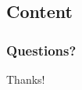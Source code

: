 \documentclass{i20lecture}
\begin{document}
\subsection{Content}

\begin{frame}
  \frametitle{\insertsection}
  \framesubtitle{\insertsubsection}

\end{frame}

\begin{frame}
  \frametitle{Questions?}

  \begin{center}
    \LARGE Thanks!
  \end{center}

\end{frame}
\end{document}
